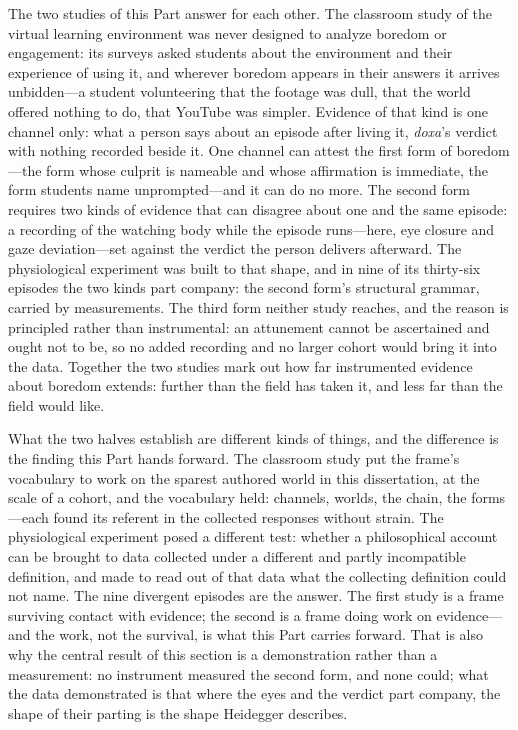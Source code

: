The two studies of this Part answer for each other. The classroom study of the virtual
learning environment was never designed to analyze boredom or engagement: its surveys asked
students about the environment and their experience of using it, and wherever boredom
appears in their answers it arrives unbidden---a student volunteering that the footage was
dull, that the world offered nothing to do, that YouTube was simpler. Evidence of that kind
is one channel only: what a person says about an episode after living it, \textit{doxa}'s
verdict with nothing recorded beside it. One channel can attest the first form of
boredom---the form whose culprit is nameable and whose affirmation is immediate, the form
students name unprompted---and it can do no more. The second form requires two kinds of
evidence that can disagree about one and the same episode: a recording of the watching body
while the episode runs---here, eye closure and gaze deviation---set against the verdict the
person delivers afterward. The physiological experiment was built to that shape, and in nine
of its thirty-six episodes the two kinds part company: the second form's structural grammar,
carried by measurements. The third form neither study reaches, and the reason is principled
rather than instrumental: an attunement cannot be ascertained and ought not to be, so no
added recording and no larger cohort would bring it into the data. Together the two studies
mark out how far instrumented evidence about boredom extends: further than the field has
taken it, and less far than the field would like.

What the two halves establish are different kinds of things, and the difference is the
finding this Part hands forward. The classroom study put the frame's vocabulary to work on the
sparest authored world in this dissertation, at the scale of a cohort, and the vocabulary
held: channels, worlds, the chain, the forms---each found its referent in the collected
responses without strain. The physiological experiment posed a different test: whether a
philosophical account can be brought to data collected under a different and partly
incompatible definition, and made to read out of that data what the collecting definition
could not name. The nine divergent episodes are the answer. The first study is a frame
surviving contact with evidence; the second is a frame doing work on evidence---and the work,
not the survival, is what this Part carries forward. That is also why the central result of
this section is a demonstration rather than a measurement: no instrument measured the second
form, and none could; what the data demonstrated is that where the eyes and the verdict part
company, the shape of their parting is the shape Heidegger describes.
